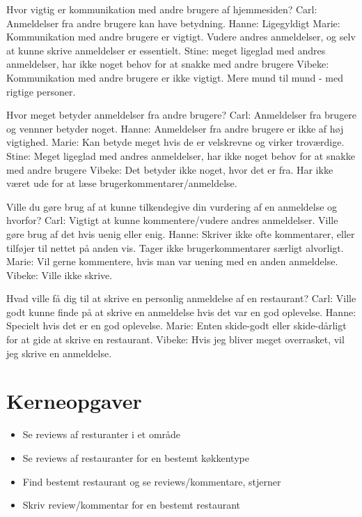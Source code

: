 \documentclass[a4paper, 12pt]{article}
\begin{document}
  Hvor vigtig er kommunikation med andre brugere af hjemmesiden?
    Carl: Anmeldelser fra andre brugere kan have betydning.
    Hanne: Ligegyldigt
    Marie: Kommunikation med andre brugere er vigtigt. Vudere andres anmeldelser, 
	   og selv at kunne skrive anmeldelser er essentielt.
    Stine: meget ligeglad med andres anmeldelser, har ikke noget behov for at snakke med andre brugere
    Vibeke: Kommunikation med andre brugere er ikke vigtigt. Mere mund til mund - med
	    rigtige personer.

  Hvor meget betyder anmeldelser fra andre brugere?
    Carl: Anmeldelser fra brugere og vennner betyder noget.
    Hanne: Anmeldelser fra andre brugere er ikke af høj vigtighed.
    Marie: Kan betyde meget hvis de er velskrevne og virker troværdige.
    Stine: Meget ligeglad med andres anmeldelser, har ikke noget behov for at snakke med andre brugere
    Vibeke: Det betyder ikke noget, hvor det er fra. Har ikke været ude for at læse
	    brugerkommentarer/anmeldelse.

  Ville du gøre brug af at kunne tilkendegive din vurdering af en anmeldelse
  og hvorfor?
    Carl: Vigtigt at kunne kommentere/vudere andres anmeldelser. Ville gøre brug af det hvis uenig eller enig.
    Hanne: Skriver ikke ofte kommentarer, eller tilføjer til nettet på anden vis. Tager ikke brugerkommentarer særligt alvorligt.
    Marie: Vil gerne kommentere, hvis man var uening med en anden anmeldelse.
    Vibeke: Ville ikke skrive.

  Hvad ville få dig til at skrive en personlig anmeldelse af en restaurant?
    Carl: Ville godt kunne finde på at skrive en anmeldelse hvis det var en god oplevelse.
    Hanne: Specielt hvis det er en god oplevelse.
    Marie: Enten skide-godt eller skide-dårligt for at gide at skrive en restaurant.
    Vibeke: Hvis jeg bliver meget overrasket, vil jeg skrive en anmeldelse.


\section{Kerneopgaver}
\label{sec:Kerneopgaver}
\begin{itemize}
\item Se reviews af resturanter i et område
\item Se reviews af restauranter for en bestemt køkkentype
\item Find bestemt restaurant og se reviews/kommentare, stjerner
\item Skriv review/kommentar for en bestemt restaurant
\end{itemize}
\end{document}
